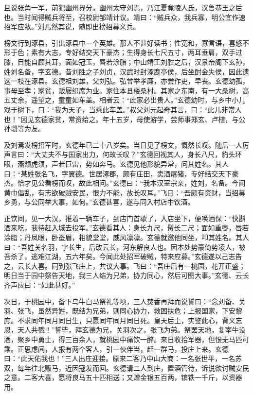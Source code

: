 \documentclass[a4paper]{article}
\begin{document}
且说张角一军，前犯幽州界分。幽州太守刘焉，乃江夏竟陵人氏，汉鲁恭王之后也。当时闻得贼兵将至，召校尉邹靖计议。靖曰：“贼兵众，我兵寡，明公宜作速招军应敌。”刘焉然其说，随即出榜招募义兵。

榜文行到涿县，引出涿县中一个英雄。那人不甚好读书；性宽和，寡言语，喜怒不形于色；素有大志，专好结交天下豪杰；生得身长七尺五寸，两耳垂肩，双手过膝，目能自顾其耳，面如冠玉，唇若涂脂；中山靖王刘胜之后，汉景帝阁下玄孙，姓刘名备，字玄德。昔刘胜之子刘贞，汉武时封涿鹿亭侯，后坐酎金失侯，因此遗这一枝在涿县。玄德祖刘雄，父刘弘。弘曾举孝廉，亦尝作吏，早丧。玄德幼孤，事母至孝；家贫，贩屦织席为业。家住本县楼桑村。其家之东南，有一大桑树，高五丈余，遥望之，童童如车盖。相者云：“此家必出贵人。”玄德幼时，与乡中小儿戏于树下，曰：“我为天子，当乘此车盖。”叔父刘元起奇其言，曰：“此儿非常人也！”因见玄德家贫，常资给之。年十五岁，母使游学，尝师事郑玄、卢植，与公孙瓒等为友。

及刘焉发榜招军时，玄德年已二十八岁矣。当日见了榜文，慨然长叹。随后一人厉声言曰：“大丈夫不与国家出力，何故长叹？”玄德回视其人，身长八尺，豹头环眼，燕颔虎须，声若巨雷，势如奔马。玄德见他形貌异常，问其姓名。其人曰：“某姓张名飞，字翼德。世居涿郡，颇有庄田，卖酒屠猪，专好结交天下豪杰。恰才见公看榜而叹，故此相问。”玄德曰：“我本汉室宗亲，姓刘，名备。今闻黄巾倡乱，有志欲破贼安民，恨力不能，故长叹耳。”飞曰：“吾颇有资财，当招募乡勇，与公同举大事，如何。”玄德甚喜，遂与同入村店中饮酒。

正饮间，见一大汉，推着一辆车子，到店门首歇了，入店坐下，便唤酒保：“快斟酒来吃，我待赶入城去投军。”玄德看其人：身长九尺，髯长二尺；面如重枣，唇若涂脂；丹凤眼，卧蚕眉，相貌堂堂，威风凛凛。玄德就邀他同坐，叩其姓名。其人曰：“吾姓关名羽，字长生，后改云长，河东解良人也。因本处势豪倚势凌人，被吾杀了，逃难江湖，五六年矣。今闻此处招军破贼，特来应募。”玄德遂以己志告之，云长大喜。同到张飞庄上，共议大事。飞曰：“吾庄后有一桃园，花开正盛；明日当于园中祭告天地，我三人结为兄弟，协力同心，然后可图大事。”玄德、云长齐声应曰：“如此甚好。”

次日，于桃园中，备下乌牛白马祭礼等项，三人焚香再拜而说誓曰：“念刘备、关羽、张飞，虽然异姓，既结为兄弟，则同心协力，救困扶危；上报国家，下安黎庶。不求同年同月同日生，只愿同年同月同日死。皇天后土，实鉴此心，背义忘恩，天人共戮！”誓毕，拜玄德为兄，关羽次之，张飞为弟。祭罢天地，复宰牛设酒，聚乡中勇士，得三百余人，就桃园中痛饮一醉。来日收拾军器，但恨无马匹可乘。正思虑间，人报有两个客人，引一伙伴当，赶一群马，投庄上来。玄德曰：“此天佑我也！”三人出庄迎接。原来二客乃中山大商：一名张世平，一名苏双，每年往北贩马，近因寇发而回。玄德请二人到庄，置酒管待，诉说欲讨贼安民之意。二客大喜，愿将良马五十匹相送；又赠金银五百两，镔铁一千斤，以资器用。
\end{document}
